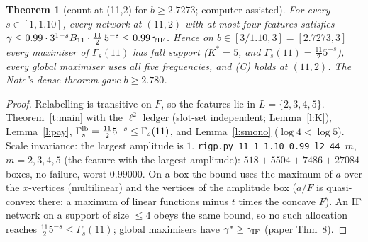 \documentclass[11pt]{article}
\newtheorem{theorem}{Theorem}\newtheorem{lemma}[theorem]{Lemma}\newtheorem{proposition}[theorem]{Proposition}
\theoremstyle{remark}\newtheorem{remark}[theorem]{Remark}
\begin{document}
\begin{theorem}[count at (11,2) for $b\ge2.7273$; computer-assisted]\label{t:11}
For every $s\in[1,1.10]$, every network at $(11,2)$ with at most four features satisfies
$\gamma\le0.99\cdot3^{1-s}B_{11}\cdot\frac{11}2\,5^{-s}\le0.99\,\gamma_{\rm IF}$.  Hence on $b\in[3/1.10,3]=[2.7273,3]$ every maximiser of
$\Gamma_s(11)$ has full support ($K^*=5$, and $\Gamma_s(11)=\frac{11}25^{-s}$), every global maximiser uses all five frequencies, and (C)
holds at $(11,2)$.  The Note's dense theorem gave $b\ge2.780$.
\end{theorem}
\begin{proof}
Relabelling is transitive on $F$, so the features lie in $L=\{2,3,4,5\}$.  Theorem~\ref{t:main} with the $\ell^2$ ledger (slot-set
independent; Lemma~\ref{l:K}), Lemma~\ref{l:pay}, $\Gamma^{\rm lb}_s=\frac{11}2 5^{-s}\le\Gamma_s(11)$, and Lemma~\ref{l:smono}
($\log4<\log5$).  Scale invariance: the largest amplitude is $1$.  \texttt{rigp.py 11 1 1.10 0.99 l2 44 $m$}, $m=2,3,4,5$ (the
feature with the largest amplitude): $518+5504+7486+27084$ boxes, no failure, worst $0.99000$.  On a box the bound uses the maximum of
$a$ over the $x$-vertices (multilinear) and the vertices of the amplitude box ($a/F$ is quasi-convex there: a maximum of linear
functions minus $t$ times the concave $F$).  An IF network on a support of size $\le4$ obeys the same bound, so no such allocation
reaches $\frac{11}25^{-s}\le\Gamma_s(11)$; global maximisers have $\gamma^*\ge\gamma_{\rm IF}$ (paper Thm~8).
\end{proof}
\end{document}
